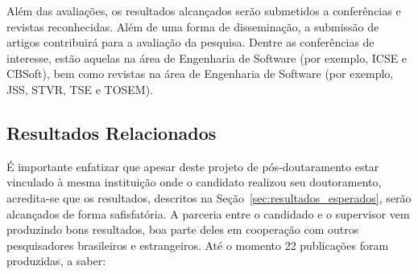 \documentclass[12pt]{article}
\begin{document}
Além das avaliações, os resultados alcançados serão submetidos a conferências e revistas reconhecidas. Além de uma forma de disseminação, a submissão de artigos contribuirá para a avaliação da pesquisa. Dentre as conferências de interesse, estão aquelas na área de Engenharia de Software (por exemplo, ICSE e CBSoft), bem como revistas na área de Engenharia de Software (por exemplo, JSS, STVR, TSE e TOSEM).

\subsection{Resultados Relacionados}

É importante enfatizar que apesar deste projeto de pós-doutaramento estar vinculado à mesma instituição onde o candidato realizou seu doutoramento, acredita-se que os resultados, descritos na Seção~\ref{sec:resultados_esperados}, serão alcançados de forma safisfatória. A parceria entre o candidado e o supervisor vem produzindo bons resultados, boa parte deles em cooperação com outros pesquisadores brasileiros e estrangeiros. Até o momento 22 publicações foram produzidas, a saber:
\end{document}
